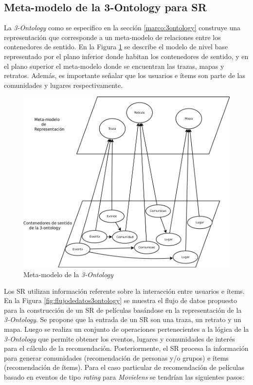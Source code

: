 
\subsection{Meta-modelo de la 3-Ontology para SR}

La \textit{3-Ontology} como se especifico en la sección \ref{marco:3ontology} construye una representación que corresponde a un meta-modelo de relaciones entre los contenedores de sentido. En la Figura \ref{fig:metamodelo3ontology} se describe el modelo de nivel base representado por el plano inferior donde habitan los contenedores de sentido, y en el plano superior el meta-modelo donde se encuentran las trazas, mapas y retratos. Además, es importante señalar que los usuarios e ítems son parte de las comunidades y lugares respectivamente.

\begin{figure}[tp]
	\centering
	\includegraphics[scale=.5]{images/metamodelo3ontology.png}
	\caption{Meta-modelo de la \textit{3-Ontology}}
	\label{fig:metamodelo3ontology}
\end{figure}


Los SR utilizan información referente sobre la interacción entre usuarios e ítems. En la Figura \ref{fig:flujodedatos3ontology} se muestra el flujo de datos propuesto para la construcción de un SR de películas basándose en la representación de la \textit{3-Ontology}. Se propone que la entrada de un SR son una traza, un retrato y un mapa. Luego se realiza un conjunto de operaciones pertenecientes a la lógica de la\textit{ 3-Ontology} que permite obtener los eventos, lugares y comunidades de interés para el cálculo de la recomendación. Posteriormente, el SR procesa la información para generar comunidades (recomendación de personas y/o grupos) e ítems (recomendación de ítems). Para el caso particular de recomendación de películas basado en eventos de tipo \textit{rating}  para \textit{Movielens} se tendrían las siguientes pasos:

